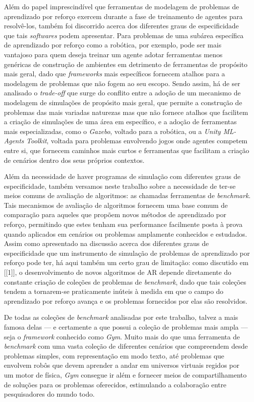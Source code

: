 \documentclass[cic,tc]{iiufrgs}
\begin{document}
Além do papel imprescindível que ferramentas de modelagem de problemas de
aprendizado por reforço exercem durante a fase de treinamento de agentes para
resolvê-los, também foi discorrido acerca dos diferentes graus de especificidade
que tais \textit{softwares} podem apresentar. Para problemas de uma subárea
específica de aprendizado por reforço como a robótica, por exemplo, pode ser
mais vantajoso para quem deseja treinar um agente adotar ferramentas menos
genéricas de construção de ambientes em detrimento de ferramentas de propósito
mais geral, dado que \textit{frameworks} mais específicos fornecem atalhos para
a modelagem de problemas que não fogem ao seu escopo. Sendo assim, há de ser
analisado o \textit{trade-off} que surge do conflito entre a adoção de um
mecanismo de modelagem de simulações de propósito mais geral, que permite a
construção de problemas das mais variadas naturezas mas que não fornece atalhos
que facilitem a criação de simulações de uma área em específico, e a adoção de
ferramentas mais especializadas, como o \textit{Gazebo}, voltado para a
robótica, ou a \textit{Unity ML-Agents Toolkit}, voltada para problemas
envolvendo jogos onde agentes competem entre si, que fornecem caminhos mais
curtos e ferramentas que facilitam a criação de cenários dentro dos seus
próprios contextos.


Além da necessidade de haver programas de simulação com diferentes graus de
especificidade, também versamos neste trabalho sobre a necessidade de ter-se
meios comuns de avaliação de algoritmos: as chamadas ferramentas de
\textit{benchmark}. Tais mecanismos de avaliação de algoritmos fornecem uma base
comum de comparação para aqueles que propõem novos métodos de aprendizado por
reforço, permitindo que estes tenham sua performance facilmente posta à prova
quando aplicados em cenários ou problemas amplamente conhecidos e estudados.
Assim como apresentado na discussão acerca dos diferentes graus de
especificidade que um instrumento de simulação de problemas de aprendizado por
reforço pode ter, há aqui também um certo grau de limitação: como discutido em
[[1]], o desenvolvimento de novos algoritmos de AR depende diretamente do
constante criação de coleções de problemas de \textit{benchmark}, dado que tais
coleções tendem a tornarem-se praticamente inúteis à medida em que o campo do
aprendizado por reforço avança e os problemas fornecidos por elas são
resolvidos.


De todas as coleções de \textit{benchmark} analisadas por este trabalho, talvez
a mais famosa delas --- e certamente a que possui a coleção de problemas mais
ampla --- seja o \textit{framework} conhecido como \textit{Gym}. Muito mais do
que uma ferramenta de \textit{benchmark} com uma vasta coleção de diferentes
cenários que compreendem desde problemas simples, com representação em modo
texto, até problemas que envolvem robôs que devem aprender a andar em universos
virtuais regidos por um motor de física, \textit{Gym} consegue ir além e
fornecer meios de compartilhamento de soluções para os problemas oferecidos,
estimulando a colaboração entre pesquisadores do mundo todo.
\end{document}
